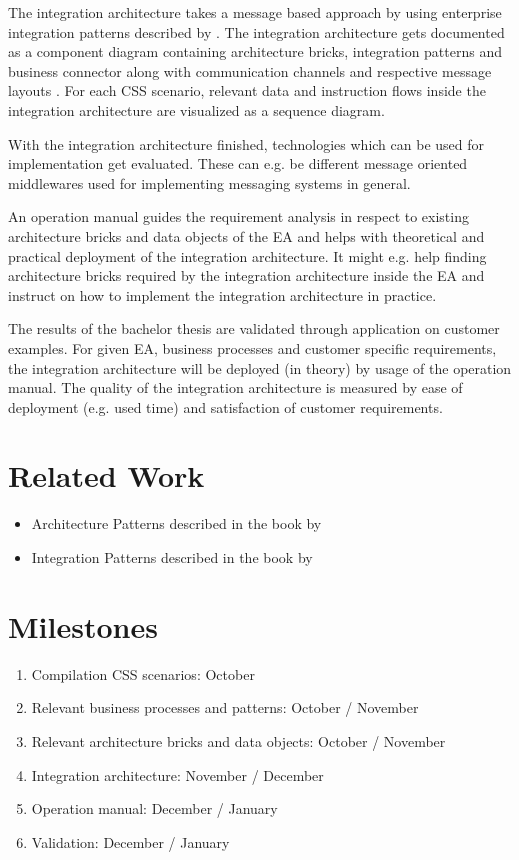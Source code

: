 \documentclass{article}
\begin{document}
The integration architecture takes a message based approach by using enterprise integration patterns described
by \cite{integrationPatterns}.
The integration architecture gets documented as a component diagram
containing architecture bricks, integration patterns and business connector along with communication 
channels and respective message layouts \cite[cf. 16 ff.]{integrationPatterns}.
For each CSS scenario, relevant data and instruction flows inside the integration architecture 
are visualized as a sequence diagram.

With the integration architecture finished, technologies which can be used for implementation get evaluated.
These can e.g. be different message oriented middlewares used for implementing messaging systems in general.

An operation manual guides the requirement analysis in respect to existing architecture bricks and data 
objects of the EA and helps with theoretical and practical deployment of the integration architecture.
It might e.g. help finding architecture bricks required by the integration architecture inside the EA 
and instruct on how to implement the integration architecture in practice.

The results of the bachelor thesis are validated through application on customer examples. For given 
EA, business processes and customer specific requirements, the integration architecture will be 
deployed (in theory) by usage of the operation manual.
The quality of the integration architecture is measured by ease of deployment (e.g. used time) and 
satisfaction of customer requirements.

\section{Related Work}

\begin{itemize}
    \item Architecture Patterns described in the book by \cite{architecturePatterns}
    \item Integration Patterns described in the book by \cite{integrationPatterns}
\end{itemize}

\section{Milestones}

\begin{enumerate}
    \item Compilation CSS scenarios: October
    \item Relevant business processes and patterns: October / November
    \item Relevant architecture bricks and data objects: October / November
    \item Integration architecture: November / December
    \item Operation manual: December / January
    \item Validation: December / January
\end{enumerate}

\printbibliography
\end{document}
